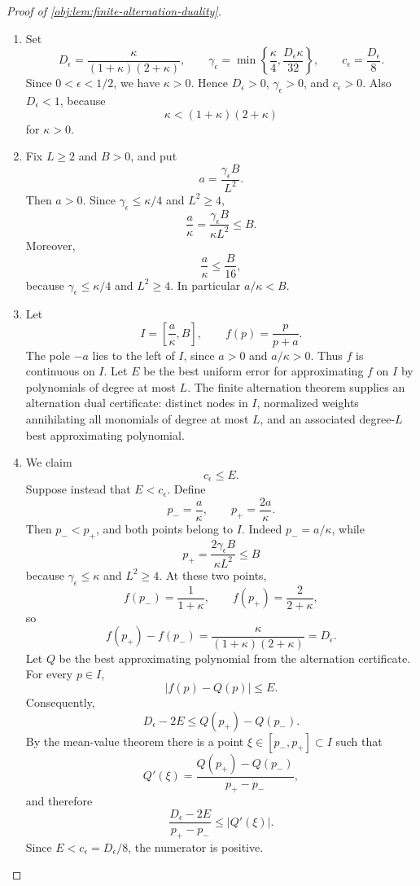 \begin{proof}[Proof of \cref{obj:lem:finite-alternation-duality}]
\begin{enumerate}
\item Set
\[
D_\epsilon=\frac{\kappa}{(1+\kappa)(2+\kappa)},\qquad
\gamma_\epsilon=\min\left\{\frac{\kappa}{4},\frac{D_\epsilon\kappa}{32}\right\},\qquad
c_\epsilon=\frac{D_\epsilon}{8}.
\]
Since \(0<\epsilon<1/2\), we have \(\kappa>0\). Hence \(D_\epsilon>0\), \(\gamma_\epsilon>0\), and \(c_\epsilon>0\). Also \(D_\epsilon<1\), because
\[
\kappa<(1+\kappa)(2+\kappa)
\]
for \(\kappa>0\). %

\item Fix \(L\ge2\) and \(B>0\), and put
\[
a=\frac{\gamma_\epsilon B}{L^2}.
\]
Then \(a>0\). Since \(\gamma_\epsilon\le \kappa/4\) and \(L^2\ge4\),
\[
\frac{a}{\kappa}
=\frac{\gamma_\epsilon B}{\kappa L^2}
\le B.
\]
Moreover,
\[
\frac{a}{\kappa}\le \frac{B}{16},
\]
because \(\gamma_\epsilon\le \kappa/4\) and \(L^2\ge4\). In particular \(a/\kappa<B\). %

\item Let
\[
I=\left[\frac{a}{\kappa},B\right],
\qquad
f(p)=\frac{p}{p+a}.
\]
The pole \(-a\) lies to the left of \(I\), since \(a>0\) and \(a/\kappa>0\). Thus \(f\) is continuous on \(I\). Let \(E\) be the best uniform error for approximating \(f\) on \(I\) by polynomials of degree at most \(L\). The finite alternation theorem supplies an alternation dual certificate: distinct nodes in \(I\), normalized weights annihilating all monomials of degree at most \(L\), and an associated degree-\(L\) best approximating polynomial. %

\item We claim
\[
c_\epsilon\le E.
\]
Suppose instead that \(E<c_\epsilon\). Define
\[
p_-=\frac{a}{\kappa},\qquad p_+=\frac{2a}{\kappa}.
\]
Then \(p_-<p_+\), and both points belong to \(I\). Indeed \(p_-=a/\kappa\), while
\[
p_+=\frac{2\gamma_\epsilon B}{\kappa L^2}\le B
\]
because \(\gamma_\epsilon\le \kappa\) and \(L^2\ge4\). At these two points,
\[
f(p_-)=\frac{1}{1+\kappa},\qquad
f(p_+)=\frac{2}{2+\kappa},
\]
so
\[
f(p_+)-f(p_-)
=\frac{\kappa}{(1+\kappa)(2+\kappa)}
=D_\epsilon.
\]
Let \(Q\) be the best approximating polynomial from the alternation certificate. For every \(p\in I\),
\[
|f(p)-Q(p)|\le E.
\]
Consequently,
\[
D_\epsilon-2E
\le Q(p_+)-Q(p_-).
\]
By the mean-value theorem there is a point \(\xi\in[p_-,p_+]\subset I\) such that
\[
Q'(\xi)=\frac{Q(p_+)-Q(p_-)}{p_+-p_-},
\]
and therefore
\[
\frac{D_\epsilon-2E}{p_+-p_-}\le |Q'(\xi)|.
\]
Since \(E<c_\epsilon=D_\epsilon/8\), the numerator is positive. %


\end{enumerate}
\end{proof}
